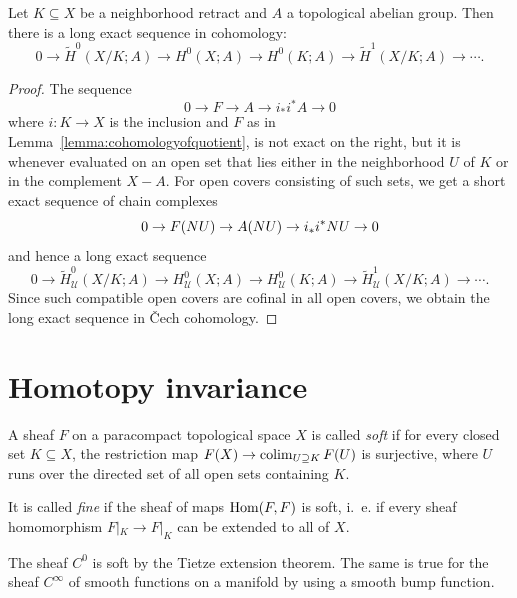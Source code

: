 \documentclass[a4paper,openany]{scrbook}
\newcommand{\nerve}{\mathcal N}
\begin{document}
\begin{corollary}\label{cor:sesforspaces}
Let $K \subseteq X$ be a neighborhood retract and $A$ a topological abelian group. Then there is a long exact sequence in cohomology:
\[
0 \to \tilde H^0(X/K;A) \to H^0(X;A) \to H^0(K;A) \to \tilde H^1(X/K;A) \to \cdots.
\]
\end{corollary}
\begin{proof}
The sequence
\[
0 \to F \to A \to i_*i^*A \to 0
\]
where $i \colon K \to X$ is the inclusion and $F$ as in Lemma~\ref{lemma:cohomologyofquotient}, is not exact on the right, but it is whenever evaluated on an open set that lies either in the neighborhood $U$ of $K$ or in the complement $X-A$. For open covers consisting of such sets, we get a short exact sequence of chain complexes
\[
0 \to F(\mathcal \nerve U) \to A(\mathcal \nerve U) \to i_*i^*\mathcal \nerve U \to 0
\]
and hence a long exact sequence
\[
0 \to \tilde H^0_{\mathcal U}(X/K;A) \to H^0_{\mathcal U}(X;A) \to H^0_{\mathcal U}(K;A) \to \tilde H^1_{\mathcal U}(X/K;A) \to \cdots.
\]
Since such compatible open covers are cofinal in all open covers, we obtain the long exact sequence in \v Cech cohomology.
\end{proof}


\section{Homotopy invariance}

\begin{defn} A sheaf $F$ on a paracompact topological space $X$ is called \emph{soft} if for every closed set $K \subseteq X$, the restriction map $F(X) \to \colim_{U \supseteq K} F(U)$ is surjective, where $U$ runs over the directed set of all open sets containing $K$.

It is called \emph{fine} if the sheaf of maps $\operatorname{Hom}(F,F)$ is soft, i.~e. if every sheaf homomorphism $F|_K \to F|_K$ can be extended to all of $X$.
\end{defn}

\begin{example}
The sheaf $C^0$ is soft by the Tietze extension theorem. The same is true for the sheaf $C^\infty$ of smooth functions on a manifold by using a smooth bump function.
\end{example}
\end{document}
